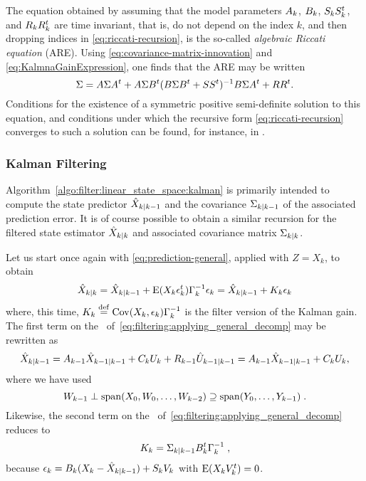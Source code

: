 \begin{rem}
The equation obtained by assuming that the model parameters
$A_k$, $B_k$, $\VCov[k]$, and $\WCov[k]$ are time invariant, that is,
do not depend on the index $k$, and then dropping indices
in \eqref{eq:riccati-recursion}, is the so-called
\emph{algebraic Riccati equation} (ARE). Using
\eqref{eq:covariance-matrix-innovation}
and \eqref{eq:KalmnaGainExpression}, one finds that the
ARE may be written
$$
\Sigma = \A\Sigma\A^t + \A\Sigma\B^t(\B\Sigma\B^t+\VCov)^{-1}\B\Sigma\A^t
 + \WCov.
$$
Conditions for the existence of a symmetric positive semi-definite solution
to this equation, and conditions under which the recursive
form \eqref{eq:riccati-recursion} converges to such a solution
can be found, for instance, in \cite{caines:1988}.
\end{rem}

\subsubsection{Kalman Filtering}
Algorithm~\ref{algo:filter:linear_state_space:kalman} is primarily intended
to compute the state predictor $\hat{X}_{k|k-1}$ and the covariance
$\Sigma_{k|k-1}$ of the associated prediction error. It is of course possible
to obtain a similar recursion for the filtered state estimator $\hat{X}_{k|k}$
and associated covariance matrix $\Sigma_{k|k}$.

Let us start once again with \eqref{eq:prediction-general}, applied with $Z=X_{k}$, to obtain
\begin{equation}
\label{eq:filtering:applying_general_decomp}
\hat{X}_{k|k} = \hat{X}_{k|k-1} + \operatorname{E}(X_k \epsilon_k^t) \Gamma^{-1}_k  \epsilon_k = \hat{X}_{k|k-1} + K_{k} \epsilon_k
\end{equation}
where, this time, $K_{k} \stackrel{\mathrm{def}}{=} \operatorname{Cov}(X_k,\epsilon_k) \Gamma^{-1}_k $ is the
filter version of the  Kalman gain. The first term on the \rhs\
of~\eqref{eq:filtering:applying_general_decomp} may be rewritten as
\begin{equation}
\label{eq:predicted-state-from-filtered-state}
\hat{X}_{k|k-1} = A_{k-1} \hat{X}_{k-1|k-1} + C_k U_k +  R_{k-1} \hat{U}_{k-1|k-1} = A_{k-1} \hat{X}_{k-1|k-1} + C_k U_k,
\end{equation}
where we have used
$$
  W_{k-1} \perp \operatorname{span}(X_0, W_0, \dotsc, W_{k-2})
  \supseteq \operatorname{span}(Y_0, \dotsc, Y_{k-1}) \; .
$$
Likewise, the second term on the \rhs\
  of~\eqref{eq:filtering:applying_general_decomp} reduces to
\begin{equation}
\label{eq:expression-Kalman-gain-filtered}
K_{k} = \Sigma_{k|k-1} B_k^t \Gamma_k^{-1} \; ,
\end{equation}
because $\epsilon_k = B_k (X_k - \hat{X}_{k|k-1}) + S_k V_k$ with
$\operatorname{E}(X_k V_k^t)= 0$.


